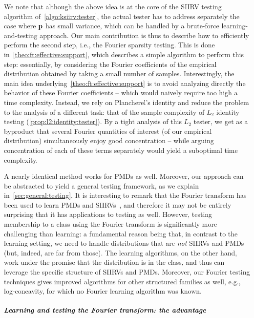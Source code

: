 We note that although the above idea is at the core of the SIIRV testing algorithm of~\cref{algo:ksiirv:tester}, 
the actual tester has to address separately the case where $\mathbf{p}$ has small variance, which can be handled by a brute-force learning-and-testing approach. 
Our main contribution is thus to describe how to efficiently perform the second step, i.e., the Fourier sparsity testing. 
This is done in~\cref{theo:ft:effective:support}, which describes a simple algorithm to perform this step: essentially, by considering the Fourier coefficients 
of the empirical distribution obtained by taking a small number of samples. Interestingly, the main idea underlying~\cref{theo:ft:effective:support} 
is to avoid analyzing directly the behavior of these Fourier coefficients -- which would naively require too high a time complexity. 
Instead, we rely on Plancherel's identity and reduce the problem to the analysis of a different task:  
that of the sample complexity of $L_2$ identity testing (\cref{prop:l2:identity:tester}). By a tight analysis of this $L_2$ tester, 
we get as a byproduct that several Fourier quantities of interest (of our empirical distribution) simultaneously enjoy 
good concentration -- while arguing concentration of each of these terms separately would yield a suboptimal time complexity. 

A nearly identical method works for PMDs as well. Moreover, our approach can be abstracted 
to yield a general testing framework, as we explain in~\cref{sec:general:testing}. It is interesting to
remark that the Fourier transform has been used to learn PMDs and SIIRVs~\cite{DKS:15, DKT:15, DKS:15b, DDKT:16}, and therefore it may not be entirely surprising that it has applications to testing as well. 
However, testing membership to a class using the Fourier transform is significantly more challenging than learning: a fundamental reason being that, in contrast to the learning 
setting, we need to handle distributions that are \emph{not} SIIRVs and PMDs (but, indeed, are far from those). The learning algorithms, on the other hand, work under the promise that the distribution is in the class, and thus can leverage the specific structure of SIIRVs and PMDs. Moreover, our Fourier testing techniques gives
improved algorithms for other structured families as well, e.g., log-concavity, for which no Fourier learning algorithm was known.

\subparagraph{Learning and testing the Fourier transform: the advantage}

